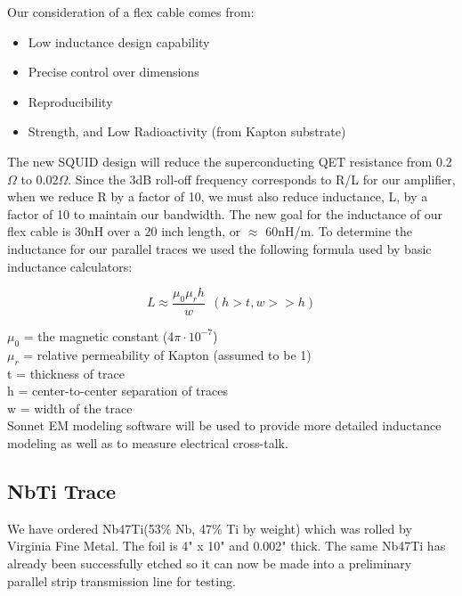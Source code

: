 \documentclass{report}
\begin{document}
Our consideration of a flex cable comes from:
\begin{itemize}
\item Low inductance design capability
\item Precise control over dimensions
\item Reproducibility
\item Strength, and Low Radioactivity (from Kapton substrate)
\end{itemize}

The new SQUID design will reduce the superconducting QET resistance from 0.2$\Omega$ to 0.02$\Omega$. Since the 3dB roll-off frequency corresponds to R/L for our amplifier, when we reduce R by a factor of 10, we must also reduce inductance, L, by a factor of 10 to maintain our bandwidth. The new goal for the inductance of our flex cable is 30nH over a 20 inch length, or $\approx$ 60nH/m. To determine the inductance for our parallel traces we used the following formula used by basic inductance calculators:

$$ L \approx \frac{\mu_{0}\mu_{r}h}{w} \ \ (h > t , w >> h)$$

$\mu_{0}$ = the magnetic constant (4$\pi \cdot 10^{-7}$)\\
$\mu_{r}$ = relative permeability of Kapton (assumed to be 1)\\
t = thickness of trace \\
h = center-to-center separation of traces \\
w = width of the trace \\

Sonnet EM modeling software will be used to provide more detailed inductance modeling as well as to measure electrical cross-talk.

\subsection{NbTi Trace}

We have ordered Nb47Ti(53\% Nb, 47\% Ti by weight) which was rolled by Virginia Fine Metal. The foil is 4" x 10" and 0.002" thick. The same Nb47Ti has already been successfully etched so it can now be made into a preliminary parallel strip transmission line for testing.
\end{document}
